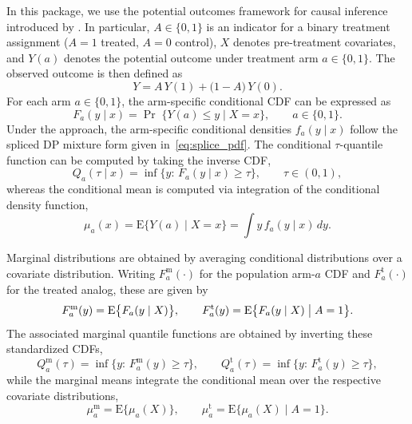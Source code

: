 \documentclass[article]{jss}\usepackage[]{graphicx}\usepackage[]{xcolor}
\begin{document}
In this package, we use the potential outcomes framework for causal inference introduced by
\citet{Rubin1974}. In particular, $A\in\{0,1\}$
is an indicator for a binary treatment assignment ($A=1$ treated, $A=0$
control), $X$ denotes pre-treatment covariates, and $Y(a)$ denotes the
potential outcome under treatment arm $a\in\{0,1\}$.  The observed outcome is then defined as
\begin{equation*}
Y = A\,Y(1) + \bigl(1-A\bigr)\,Y(0).
\end{equation*}
For each arm $a\in\{0,1\}$, the arm-specific conditional CDF
can be expressed as
\begin{equation*}
F_a(y\mid x)=\Pr\;\{Y(a)\le y \mid X=x\},\qquad a\in\{0,1\}.
\end{equation*}
Under the  approach, the arm-specific conditional
densities $f_a(y\mid x)$ follow the spliced DP mixture form
given in~\eqref{eq:splice_pdf}.  The conditional $\tau$-quantile function can be computed by taking the inverse CDF,
\begin{equation*}
Q_a(\tau\mid x)=\inf\{y:\,F_a(y\mid x)\ge \tau\},\qquad \tau\in(0,1),
\end{equation*}
whereas the conditional mean is computed via integration of the conditional
density function,
\begin{equation*}
\mu_a(x)=\mathrm{E}\{Y(a)\mid X=x\}=\int y\, f_a(y\mid x)\,dy.
\end{equation*}


Marginal distributions are obtained by averaging
conditional distributions over a covariate distribution.  Writing
$F_a^{\mathrm{m}}(\cdot)$ for the population arm-$a$ CDF and
$F_a^{\mathrm{t}}(\cdot)$ for the treated analog, these are given by
\begin{equation*}
F_a^{\mathrm{m}}(y)=\mathrm{E}\bigl\{F_a(y\mid X)\bigr\},
\qquad
F_a^{\mathrm{t}}(y)=\mathrm{E}\bigl\{F_a(y\mid X)\bigm\vert A=1\bigr\}.
\end{equation*}
The associated marginal quantile functions are obtained by inverting
these standardized CDFs,
\begin{equation*}
Q_a^{\mathrm{m}}(\tau)=\inf\{y:\,F_a^{\mathrm{m}}(y)\ge \tau\},
\qquad
Q_a^{\mathrm{t}}(\tau)=\inf\{y:\,F_a^{\mathrm{t}}(y)\ge \tau\},
\end{equation*}
while the marginal means integrate the conditional mean over the
respective covariate distributions,
\begin{equation*}
\mu_a^{\mathrm{m}}=\mathrm{E}\bigl\{\mu_a(X)\bigr\},
\qquad
\mu_a^{\mathrm{t}}=\mathrm{E}\bigl\{\mu_a(X)\mid A=1\bigr\}.
\end{equation*}
\end{document}
